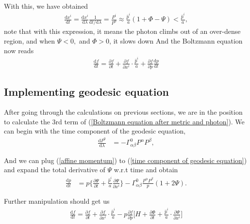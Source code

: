 \documentclass[a4paper, 12pt]{article}
\begin{document}
{{   With this, we have obtained 
   \begin{align}
    \label{v in t}
     \frac{\mathrm{d}x^{i} }{\mathrm{d}t} =
     \frac{\mathrm{d}x^{i}
     }{\mathrm{d}\lambda}\frac{1}{\mathrm{d}t /
     \mathrm{d}\lambda} = \frac{P^{i} }{P^{0} } \approx
     \frac{\hat{p}^{i} }{a} ( 1 + \Phi - \Psi ) <
     \frac{\hat{p}^{i} }{a},
   \end{align} note that with this expression, it means the photon
   climbs out of an over-dense region, and when \( \Psi < 0,  \) and \(
   \Phi > 0 \), it slows down
   And the Boltzmann equation now reads 
   \begin{align}
    \label{Boltzmann equation after metric and photon}
     \frac{\mathrm{d}f}{\mathrm{d}t} = \frac{\partial f}{\partial
     t} + \frac{\partial f}{\partial x^{i} } \cdot \frac{\hat{p}^{i} }{a} +
     \frac{\partial f}{\partial p} \frac{\mathrm{d}p}{\mathrm{d}t}
   \end{align}

  \subsection{Implementing geodesic equation}%
    \label{sub:Implementing geodesic equation}
    
    After going through the calculations on previous sections, we are in
    the position to calculate the 3rd term of (\ref{Boltzmann equation
    after metric and photon}). 
    We can begin with the time component of the geodesic equation, 
    \begin{align}
      \label{time component of geodesic equation}
      \frac{\mathrm{d} P^{0} }{\mathrm{d}\lambda} &= -
      \Gamma_{\alpha \beta}^{0} P^{\alpha} P^{\beta},   
    \end{align} 

      And we can plug (\ref{affine momentum}) to (\ref{time component of
      geodesic equation}) and expand the total derivative of \( \Psi \)
      w.r.t time and obtain 
      \begin{align}
        \label{dp/dt in phi}
        \frac{\mathrm{d} p}{\mathrm{d}t} &= p \bigg\{ \frac{\partial
        \Psi}{\partial t}  + \frac{\hat{p}^{i} }{a} \frac{\partial
        \Psi}{\partial x^{i} }   \bigg\}  -
        \Gamma_{\alpha\beta}^{0} \frac{P^{\alpha} P^{\beta}  }{p}
        (1 + 2\Psi).
      \end{align}

      Further manipulation should get us 
      \begin{align}
        \label{final boltzmann for metric photon}
        \frac{\mathrm{d}f}{\mathrm{d}t}  = \frac{\partial f}{\partial
        t} + \frac{\partial f}{\partial x^{i} } \cdot
        \frac{\hat{p}^{i} }{a} - p \frac{\partial f}{\partial p}
        \bigg[ H + \frac{\partial \Phi}{\partial t}  +
        \frac{\hat{p}^{i} }{a}\cdot \frac{\partial \Psi}{\partial
        x^{i} }  \bigg]  
      \end{align}

}}
\end{document}
